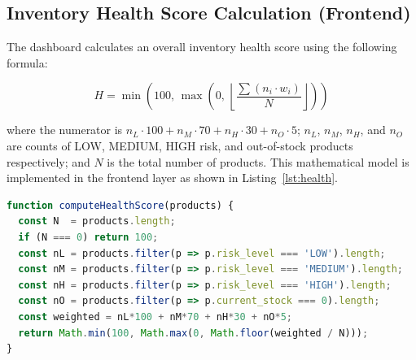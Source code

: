 \subsection{Inventory Health Score Calculation (Frontend)}

The dashboard calculates an overall inventory health score using the following formula:

\begin{equation}
\label{eq:health_score}
H = \min\!\left(100,\, \max\!\left(0,\, \left\lfloor \frac{\sum (n_i \cdot w_i)}{N} \right\rfloor\right)\right)
\end{equation}

where the numerator is $n_L \cdot 100 + n_M \cdot 70 + n_H \cdot 30 + n_O \cdot 5$; $n_L$, $n_M$, $n_H$, and $n_O$ are counts of LOW, MEDIUM, HIGH risk, and out-of-stock products respectively; and $N$ is the total number of products. This mathematical model is implemented in the frontend layer as shown in Listing~\ref{lst:health}.

\begin{lstlisting}[language=javascript, caption={Inventory Health Score Implementation}, label={lst:health}]
function computeHealthScore(products) {
  const N  = products.length;
  if (N === 0) return 100;
  const nL = products.filter(p => p.risk_level === 'LOW').length;
  const nM = products.filter(p => p.risk_level === 'MEDIUM').length;
  const nH = products.filter(p => p.risk_level === 'HIGH').length;
  const nO = products.filter(p => p.current_stock === 0).length;
  const weighted = nL*100 + nM*70 + nH*30 + nO*5;
  return Math.min(100, Math.max(0, Math.floor(weighted / N)));
}
\end{lstlisting}
